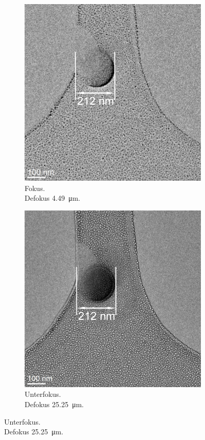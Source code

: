 \documentclass[slug=TEM, room=IFW, supervisor=?, coursedate=23.\ 01.\ 2020]{../../Lab_Report_LaTeX/lab_report}
\begin{document}
\begin{figure}[h]
  \centering
  \begin{subfigure}{.29\textwidth}
    \includegraphics[width=.8\textwidth]{../messungen/Fokus_Latex/auswertung/Fokus0m.jpg}
    \caption{Fokus.\\ Defokus \SI{4.49}{\micro\meter}.}
    \label{fig:fokus}
  \end{subfigure}
  \begin{subfigure}{.29\textwidth}
    \includegraphics[width=.8\textwidth]{../messungen/Fokus_Latex/auswertung/Fokus20m.jpg}
    \caption{Unterfokus.\\ Defokus \SI{25.25}{\micro\meter}.}

\end{subfigure}
\end{figure}
\end{document}
